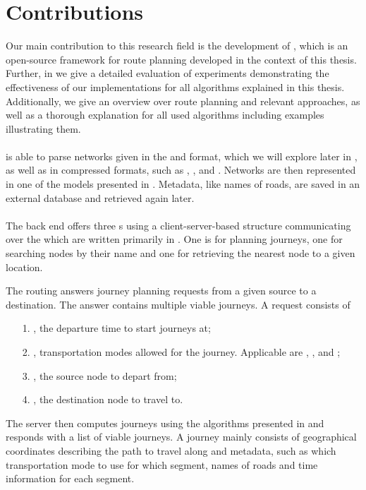 \section{Contributions}
	Our main contribution to this research field is the development of \cobweb {}, which is an open-source
	framework for \multiModal route planning developed in the context of this thesis. Further, in 
	we give a detailed evaluation of experiments demonstrating the effectiveness of our implementations for all algorithms
	explained in this thesis. Additionally, we give an overview over route planning and relevant approaches, as well as a
	thorough explanation for all used algorithms including examples illustrating them.\\\\
	\cobweb is able to parse networks given in the \osm and \gtfs format, which we will explore later in , as well as
	in compressed formats, such as \bzipTwo {}, \gzip {}, \zip {} and \xz {}.
	Networks are then represented in one of the models presented in . Metadata, like names of roads, are saved in an external
	database and retrieved again later.\\\\
	The back end offers three {\restApi}s  using a client-server-based structure communicating over the \http {} which
	are written primarily in \java.
	One \api is for planning journeys, one for searching nodes by their name and one for retrieving the nearest node to a given location.
	
	The routing \api answers journey planning requests from a given source to a destination. The answer contains multiple viable journeys.
	A request consists of
	\begin{itemize}
		\item[1.] \depTime, the departure time to start journeys at;
		\item[2.] \modes, transportation modes allowed for the journey. Applicable are \car, \bike, \foot and \tram;
		\item[3.] \fromJ, the source node to depart from;
		\item[4.] \toJ, the destination node to travel to.
	\end{itemize}
	The server then computes journeys using the algorithms presented in  and responds with a list of viable
	journeys. A journey mainly consists of geographical coordinates describing the path to travel along and metadata, such as which
	transportation mode to use for which segment, names of roads and time information for each segment.
	
